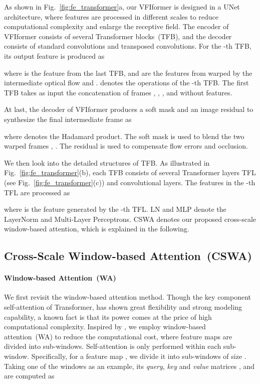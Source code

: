 \documentclass[10pt,twocolumn,letterpaper]{article}
\begin{document}
	As shown in Fig.~\ref{fig:fe_transformer}a, our VFIformer is designed in a UNet architecture, where features are processed in different scales to reduce computational complexity and enlarge the receptive field.
	The encoder of VFIformer consists of several Transformer blocks~(TFB), and the decoder consists of standard convolutions and transposed convolutions.
	For the -th TFB, its output feature  is produced as
	
	where  is the feature from the last TFB,  and  are the features from  warped by the intermediate optical flow  and .  denotes the operations of the -th TFB. The first TFB takes as input the concatenation of frames , , , and  without features. 
	
	At last, the decoder of VFIformer produces a soft mask  and an image residual  to synthesize the final intermediate frame  as
	 
	where  denotes the Hadamard product. The soft mask is used to blend the two warped frames , . The residual is used to compensate flow errors and occlusion.
	
	
	We then look into the detailed structures of TFB. As illustrated in Fig.~\ref{fig:fe_transformer}(b), each TFB consists of several Transformer layers TFL (see Fig.~\ref{fig:fe_transformer}(c)) and convolutional layers. 
	The features in the -th TFL are processed as
	
	where  is the feature generated by the -th TFL. LN and MLP denote the LayerNorm and Multi-Layer Perceptrons. CSWA denotes our proposed cross-scale window-based attention, which is explained in the following.
	
	
	\subsection{Cross-Scale Window-based Attention~(CSWA)}
	\label{sec:csma}
	
	\paragraph{Window-based Attention~(WA)}
	We first revisit the window-based attention method.
	Though the key component self-attention of Transformer, has shown great flexibility and strong modeling capability, a known fact is that its power comes at the price of high computational complexity. Inspired by \cite{liu2021swin,liang2021swinir}, we employ window-based attention~(WA) to reduce the computational cost, where feature maps are divided into sub-windows. Self-attention is only performed within each sub-window. Specifically, for a feature map , we divide it into  sub-windows of size .
	Taking one of the windows  as an example, its \textit{query}, \textit{key} and \textit{value} matrices ,  and  are computed as
	
\end{document}
